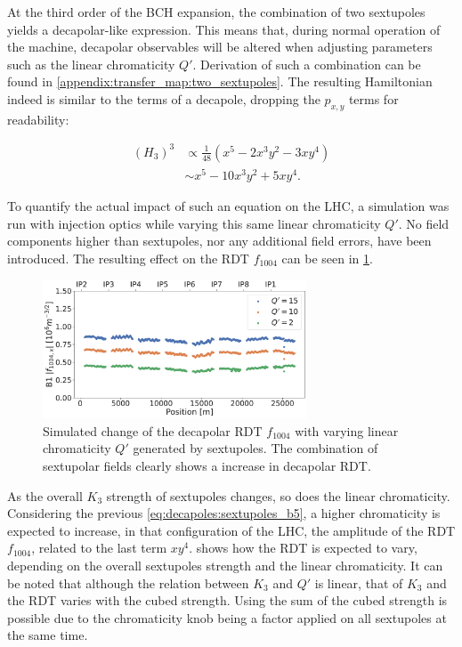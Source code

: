 At the third order of the BCH expansion, the combination of two sextupoles yields a decapolar-like
expression. This means that, during normal operation of the machine, decapolar observables will be
altered when adjusting parameters such as the linear chromaticity $Q'$. 
Derivation of such a combination can be found in \cref{appendix:transfer_map:two_sextupoles}. The
resulting Hamiltonian indeed is similar to the terms of a decapole, dropping the $p_{x,y}$ terms for
readability:

\begin{equation}
    \begin{aligned}
         (H_3)^3 &\propto \frac{1}{48} \left(x^5 - 2x^3y^2 - 3xy^4 \right)\\
                 &\sim    x^5 - 10x^3y^2 + 5xy^4.
    \end{aligned}
    \label{eq:decapoles:sextupoles_b5}
\end{equation}

To quantify the actual impact of such an equation on the LHC, a simulation was run with injection
optics while varying this same linear chromaticity $Q'$. No field components higher than
sextupoles, nor any additional field errors, have been introduced. The resulting effect on the RDT
$f_{1004}$ can be seen in \cref{fig:decapoles:rdts:simulated_f1004_from_sextupoles}.


\begin{figure}[H]
    \centering
    \includegraphics[width=0.7\textwidth]{./images/f1004/f1004_dq.pdf}
    \caption{Simulated change of the decapolar RDT $f_{1004}$ with varying linear
    chromaticity $Q'$ generated by sextupoles. The combination of sextupolar fields clearly shows a 
    increase in decapolar RDT.}
    \label{fig:decapoles:rdts:simulated_f1004_from_sextupoles}
\end{figure}

As the overall $K_3$ strength of sextupoles changes, so does the linear chromaticity. 
Considering the previous \cref{eq:decapoles:sextupoles_b5}, a higher chromaticity
is expected to increase, in that configuration of the LHC, the amplitude of the RDT $f_{1004}$,
related to the last term $xy^4$.  shows how the RDT is
expected to vary, depending on the overall sextupoles strength and the linear chromaticity. It can
be noted that although the relation between $K_3$ and $Q'$ is linear, that of $K_3$ and the RDT
varies with the cubed strength. Using the sum of the cubed strength is possible due to the
chromaticity knob being a factor applied on all sextupoles at the same time.

